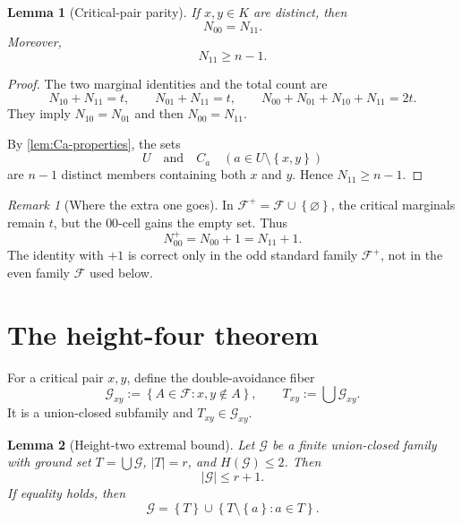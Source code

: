 \documentclass[11pt,reqno]{amsart}
\numberwithin{equation}{section}
\newtheorem{lemma}[lemma]{Lemma}
\theoremstyle{definition}
\theoremstyle{remark}
\newtheorem{remark}[remark]{Remark}
\newcommand{\F}{\mathcal{F}}
\newcommand{\G}{\mathcal{G}}
\newcommand{\1}{\mathbf{1}}
\newcommand{\set}[1]{\left\{#1\right\}}
\newcommand{\abs}[1]{\left|#1\right|}
\begin{document}
\begin{lemma}[Critical-pair parity]\label{lem:pair-parity}
If \(x,y\in K\) are distinct, then
\begin{equation}\label{eq:N00=N11}
\boxed{N_{00}=N_{11}.}
\end{equation}
Moreover,
\begin{equation}\label{eq:N11-lower}
N_{11}\ge n-1.
\end{equation}
\end{lemma}

\begin{proof}
The two marginal identities and the total count are
\[
N_{10}+N_{11}=t,
\qquad
N_{01}+N_{11}=t,
\qquad
N_{00}+N_{01}+N_{10}+N_{11}=2t.
\]
They imply \(N_{10}=N_{01}\) and then \(N_{00}=N_{11}\).

By \cref{lem:Ca-properties}, the sets
\[
U
\quad\text{and}\quad
C_a\quad(a\in U\setminus\set{x,y})
\]
are \(n-1\) distinct members containing both \(x\) and \(y\).  Hence \(N_{11}\ge n-1\).
\end{proof}

\begin{remark}[Where the extra one goes]\label{rem:parity-firewall}
In \(\F^+=\F\cup\set{\varnothing}\), the critical marginals remain \(t\), but the \(00\)-cell gains the empty set.  Thus
\[
N_{00}^{+}=N_{00}+1=N_{11}+1.
\]
The identity with \(+1\) is correct only in the odd standard family \(\F^+\), not in the even family \(\F\) used below.
\end{remark}

\section{The height-four theorem}

For a critical pair \(x,y\), define the double-avoidance fiber
\begin{equation}\label{eq:Gxy}
\G_{xy}:=\set{A\in\F:x,y\notin A},
\qquad
T_{xy}:=\bigcup\G_{xy}.
\end{equation}
It is a union-closed subfamily and \(T_{xy}\in\G_{xy}\).

\begin{lemma}[Height-two extremal bound]\label{lem:height2-extremal}
Let \(\G\) be a finite union-closed family with ground set
\(
T=\bigcup\G
\), \(\abs{T}=r\), and \(H(\G)\le2\).  Then
\begin{equation}\label{eq:height2-size}
\abs{\G}\le r+1.
\end{equation}
If equality holds, then
\begin{equation}\label{eq:height2-equality}
\G=\set{T}\cup\set{T\setminus\set{a}:a\in T}.
\end{equation}
\end{lemma}
\end{document}
